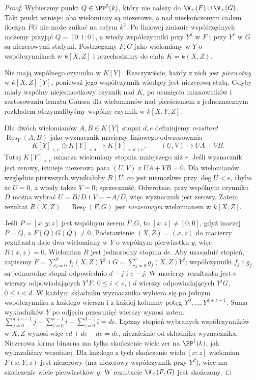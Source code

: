 \begin{proof}
Wybierzmy punkt $Q\in\PP^2(k)$, który nie należy do
$\V_+(F)\cup\V_+(G)$. Taki punkt istnieje:
oba wielomiany są niezerowe, a nad nieskończonym ciałem
iloczyn $FG$ nie może znikać na całym $k^3$.
Po liniowej zmianie współrzędnych możemy przyjąć
$Q=[0:1:0]$, a wtedy współczynniki przy $Y^d$ w $F$
i przy $Y^e$ w $G$ są niezerowymi stałymi.
Postrzegamy $F,G$ jako wielomiany w $Y$ o współczynnikach
w $k[X,Z]$ i przechodzimy do ciała $K=k(X,Z)$.

Nie mają wspólnego czynnika w $K[Y]$. Rzeczywiście,
każdy z nich jest \emph{pierwotny} w $k[X,Z][Y]$,
ponieważ jego współczynnik wiodący jest niezerową stałą.
Gdyby miały wspólny niejednostkowy czynnik nad $K$,
po usunięciu mianowników i zastosowaniu lematu Gaussa
dla wielomianów nad pierścieniem z jednoznacznym rozkładem
otrzymalibyśmy wspólny czynnik w $k[X,Y,Z]$.

Dla dwóch wielomianów $A,B\in K[Y]$ stopni $d,e$
definiujemy \emph{rezultant} $\operatorname{Res}_Y(A,B)$
jako wyznacznik macierzy liniowego odwzorowania
\[
 K[Y]_{<e}\oplus K[Y]_{<d}\longrightarrow K[Y]_{<d+e},
 \qquad (U,V)\longmapsto UA+VB.
\]
Tutaj $K[Y]_{<r}$ oznacza wielomiany stopnia mniejszego niż $r$.
Jeśli wyznacznik jest zerowy, istnieje niezerowa para
$(U,V)$ z $UA+VB=0$. Dla wielomianów względnie pierwszych
wynikałoby $B\mid U$, co jest niemożliwe przy $\deg U<e$,
chyba że $U=0$, a wtedy także $V=0$; sprzeczność.
Odwrotnie, przy wspólnym czynniku $D$ można wybrać
$U=B/D$ i $V=-A/D$, więc wyznacznik jest zerowy.
Zatem rezultat $R(X,Z)=\operatorname{Res}_Y(F,G)$
jest \emph{niezerowym} wielomianem w $k[X,Z]$.

Jeśli $P=[x:y:z]$ jest wspólnym zerem $F,G$, to
$[x:z]\ne[0:0]$, gdyż inaczej $P=Q$, a $F(Q)G(Q)\ne0$.
Podstawienie $(X,Z)=(x,z)$ do macierzy rezultantu
daje dwa wielomiany w $Y$ o wspólnym pierwiastku $y$,
więc $R(x,z)=0$.
Wielomian $R$ jest jednorodny stopnia $de$.
Aby uzasadnić stopień, zapiszmy
$F=\sum_{j=0}^d f_j(X,Z)Y^j$ i
$G=\sum_{j=0}^e g_j(X,Z)Y^j$; współczynniki $f_j$
i $g_j$ są jednorodne stopni odpowiednio $d-j$ i $e-j$.
W macierzy rezultantu jest $e$ wierszy odpowiadających
$Y^iF$, $0\le i<e$, i $d$ wierszy odpowiadających
$Y^iG$, $0\le i<d$. W każdym składniku wyznacznika
wybiera się po jednym współczynniku z każdego wiersza
i z każdej kolumny potęg $Y^0,\dots,Y^{d+e-1}$.
Suma wykładników $Y$ po odjęciu przesunięć wierszy
wynosi zatem
$\sum_{j=0}^{d+e-1}j-\sum_{i=0}^{e-1}i-\sum_{i=0}^{d-1}i=de$.
Łączny stopień wybranych współczynników w $X,Z$
wynosi więc $ed+de-de=de$, niezależnie od składnika
wyznacznika.
Niezerowa forma binarna ma tylko skończenie wiele zer na
$\PP^1(k)$, jak wykazaliśmy wcześniej. Dla każdego z tych
skończenie wielu $[x:z]$ wielomian $F(x,Y,z)$ jest
niezerowy (ma niezerowy współczynnik przy $Y^d$),
więc ma skończenie wiele pierwiastków $y$.
W rezultacie $\V_+(F,G)$ jest skończony.


\end{proof}
